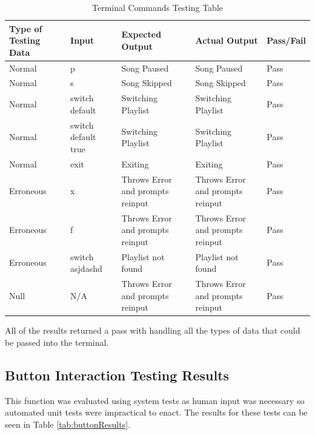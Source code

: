 \begin{table}[H]
  \centering
  \caption{Terminal Commands Testing Table}
  \label{tab:terminalResults}
  \begin{tabularx}{\linewidth}{llXXl}
    \toprule
    Type of Testing Data & Input & Expected Output & Actual Output & Pass/Fail \\ \hline
    \midrule
    Normal & p & Song Paused & Song Paused & Pass \\ \hline
    Normal & s & Song Skipped & Song Skipped & Pass \\ \hline
    Normal & switch default & Switching Playlist & Switching Playlist & Pass \\ \hline
    Normal & switch default true & Switching Playlist & Switching Playlist & Pass \\ \hline
    Normal & exit & Exiting & Exiting & Pass \\ \hline
    Erroneous & x & Throws Error and prompts reinput & Throws Error and prompts reinput & Pass \\ \hline
    Erroneous & f & Throws Error and prompts reinput & Throws Error and prompts reinput & Pass \\ \hline
    Erroneous & switch asjdashd & Playlist not found & Playlist not found & Pass \\ \hline
    Null & N/A & Throws Error and prompts reinput & Throws Error and prompts reinput & Pass \\ \hline
    \bottomrule
  \end{tabularx}
\end{table}

All of the results returned a pass with handling all the types of data that could be passed into the terminal.
\clearpage
\subsection{Button Interaction Testing Results}\label{subsec:btnResults}
This function was evaluated using system tests as human input was necessary so automated unit tests were impractical to enact. The results for these tests can be seen in Table \ref{tab:buttonResults}.

